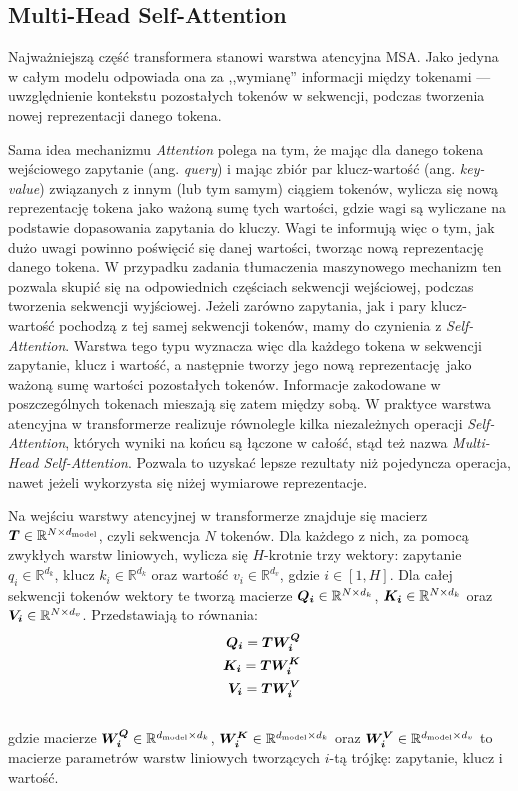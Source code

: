 \subsection{Multi-Head Self-Attention}

Najważniejszą część transformera stanowi warstwa atencyjna MSA. Jako jedyna w całym modelu odpowiada ona za ,,wymianę'' informacji między tokenami --- uwzględnienie kontekstu pozostałych tokenów w sekwencji, podczas tworzenia nowej reprezentacji danego tokena.

Sama idea mechanizmu \emph{Attention} polega na tym, że mając dla danego tokena wejściowego zapytanie (ang. \emph{query}) i mając zbiór par klucz-wartość (ang. \emph{key-value}) związanych z innym (lub tym samym) ciągiem tokenów, wylicza się nową reprezentację tokena jako ważoną sumę tych wartości, gdzie wagi są wyliczane na podstawie dopasowania zapytania do kluczy. Wagi te informują więc o tym, jak dużo uwagi powinno poświęcić się danej wartości, tworząc nową reprezentację danego tokena. W przypadku zadania tłumaczenia maszynowego mechanizm ten pozwala skupić się na odpowiednich częściach sekwencji wejściowej, podczas tworzenia sekwencji wyjściowej. Jeżeli zarówno zapytania, jak i pary klucz-wartość pochodzą z tej samej sekwencji tokenów, mamy do czynienia z \emph{Self-Attention}. Warstwa tego typu wyznacza więc dla każdego tokena w sekwencji zapytanie, klucz i wartość, a następnie tworzy jego nową reprezentację jako ważoną sumę wartości pozostałych tokenów. Informacje zakodowane w poszczególnych tokenach mieszają się zatem między sobą. W praktyce warstwa atencyjna w transformerze realizuje równolegle kilka niezależnych operacji \emph{Self-Attention}, których wyniki na końcu są łączone w całość, stąd też nazwa \emph{Multi-Head Self-Attention}. Pozwala to uzyskać lepsze rezultaty niż pojedyncza operacja, nawet jeżeli wykorzysta się niżej wymiarowe reprezentacje.

Na wejściu warstwy atencyjnej w transformerze znajduje się macierz $\boldsymbol{T} \in \mathbb{R}^{N \times d_{\mathrm{model}}}$, czyli sekwencja $N$ tokenów. Dla każdego z nich, za pomocą zwykłych warstw liniowych, wylicza się $H$-krotnie trzy wektory: zapytanie $q_i \in \mathbb{R}^{d_k}$, klucz $k_i \in \mathbb{R}^{d_k}$ oraz wartość $v_i \in \mathbb{R}^{d_v}$, gdzie $i \in [1, H]$. Dla całej sekwencji tokenów wektory te tworzą macierze $\boldsymbol{Q_i} \in \mathbb{R}^{N \times d_k}$, $\boldsymbol{K_i} \in \mathbb{R}^{N \times d_k}$ oraz $\boldsymbol{V_i} \in \mathbb{R}^{N \times d_v}$. Przedstawiają to równania:
\begin{eqnarray}
    \boldsymbol{Q_i} = \boldsymbol{T} \boldsymbol{W_i^Q} \\\
    \boldsymbol{K_i} = \boldsymbol{T} \boldsymbol{W_i^K} \\\
    \boldsymbol{V_i} = \boldsymbol{T} \boldsymbol{W_i^V} \\\
\end{eqnarray}
gdzie macierze $\boldsymbol{W_i^Q} \in \mathbb{R}^{d_{\mathrm{model}} \times d_k}$, $\boldsymbol{W_i^K} \in \mathbb{R}^{d_{\mathrm{model}} \times d_k}$ oraz $\boldsymbol{W_i^V} \in \mathbb{R}^{d_{\mathrm{model}} \times d_v}$ to macierze parametrów warstw liniowych tworzących $i$-tą trójkę: zapytanie, klucz i wartość.

